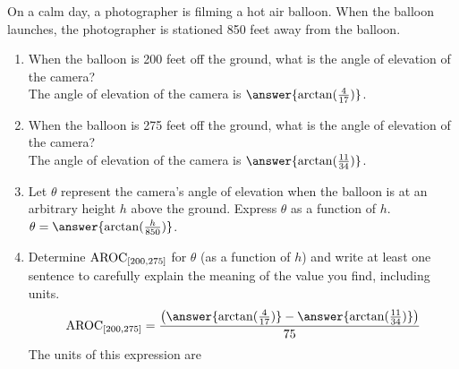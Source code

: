\documentclass{ximera}
\author{Elizabeth Campolongo}
\begin{document}
\begin{exercise}
On a calm day, a photographer is filming a hot air balloon.  When the balloon launches, the photographer is stationed 850 feet away from the balloon.
%
\begin{enumerate}
\item When the balloon is 200 feet off the ground, what is the angle of elevation of the camera?\\
The angle of elevation of the camera is $\answer{\arctan(\frac{4}{17})}$.
%
\item When the balloon is 275 feet off the ground, what is the angle of elevation of the camera?\\
The angle of elevation of the camera is $\answer{\arctan(\frac{11}{34})}$.
%
\item Let $\theta$ represent the camera's angle of elevation when the balloon is at an arbitrary height $h$ above the ground.  Express $\theta$ as a function of $h$. \\
$\theta = \answer{\arctan(\frac{h}{850})}$.
%
\item Determine $\mathrm{AROC}_{[200,275]}$ for $\theta$ (as a function of $h$) and write at least one sentence to carefully explain the meaning of the value you find, including units.\\
%
$$\av_{[200,275]} = \frac{\big(\answer{\arctan(\frac{4}{17})} - \answer{\arctan(\frac{11}{34})} \big)}{75}$$
%
The units of this expression are 
%
\begin{multipleChoice}
\end{multipleChoice}
%
\end{enumerate}
\end{exercise}
\end{document}

